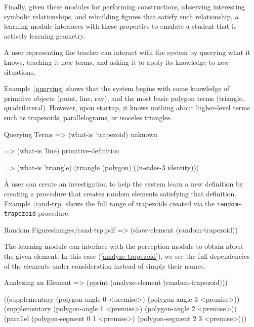 Finally, given these modules for performing constructions, observing
interesting symbolic relationships, and rebuilding figures that
satisfy such relationship, a learning module interfaces with these
properties to emulate a student that is actively learning geometry.

A user representing the teacher can interact with the system by
querying what it knows, teaching it new terms, and asking it to apply
its knowledge to new situations.

Example~\ref{querying} shows that the system begins with some
knowledge of primitive objects (point, line, ray), and the most basic
polygon terms (triangle, quadrilateral). However, upon startup, it
knows nothing about higher-level terms such as trapezoids,
parallelograms, or isoceles triangles.

\begin{repl-example}
[label=querying]
{Querying Terms}
=> (what-is 'trapezoid)
unknown

=> (what-is 'line)
primitive-definition

=> (what-is 'triangle)
(triangle (polygon)
          ((n-sides-3 identity)))
\end{repl-example}

A user can create an investigation to help the system learn a new
definition by creating a procedure that creates random elements
satisfying that definition. Example~\ref{rand-trp} shows the full
range of trapezoids created via the \texttt{random-trapezoid}
procedure.

\begin{pdf-example}
[label=rand-trp,
comment style={frame hidden,opacityback=0,
raster columns=3,graphics pages={1,2,3}}]
{Random Figures}{images/rand-trp.pdf}
=> (show-element (random-trapezoid))
\end{pdf-example}

The learning module can interface with the perception module to obtain
about the given element. In this case (\ref{analyze-trapezoid}), we
see the full dependencies of the elements under consideration instead
of simply their names.

\begin{repl-example}
[label=analyze-trapezoid]
{Analyzing an Element}
=> (pprint (analyze-element (random-trapezoid)))

((supplementary (polygon-angle 0 <premise>) (polygon-angle 3 <premise>))
 (supplementary (polygon-angle 1 <premise>) (polygon-angle 2 <premise>))
 (parallel (polygon-segment 0 1 <premise>) (polygon-segment 2 3 <premise>)))
\end{repl-example}

